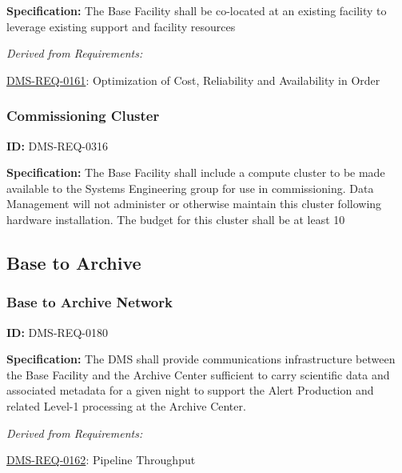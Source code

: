 \documentclass[SE,toc,lsstdraft]{lsstdoc}
\begin{document}
\textbf{Specification:} The Base Facility shall be co-located at an existing facility to leverage existing support and facility resources






\emph{Derived from Requirements:}

\hyperref[DMS-REQ-0161]{DMS-REQ-0161}:
Optimization of Cost, Reliability and Availability in Order \newline


\subsubsection{Commissioning Cluster}

\label{DMS-REQ-0316}
\textbf{ID:} DMS-REQ-0316

\textbf{Specification:} The Base Facility shall include a compute cluster to be made available to the Systems Engineering group for use in commissioning.  Data Management will not administer or otherwise maintain this cluster following hardware installation. The budget for this cluster shall be at least 10%






\subsection{Base to Archive}





\subsubsection{Base to Archive Network}

\label{DMS-REQ-0180}
\textbf{ID:} DMS-REQ-0180

\textbf{Specification:} The DMS shall provide communications infrastructure between the Base Facility and the Archive Center sufficient to carry scientific data and associated metadata for a given night to support the Alert Production and related Level-1 processing at the Archive Center.






\emph{Derived from Requirements:}

\hyperref[DMS-REQ-0162]{DMS-REQ-0162}:
Pipeline Throughput \newline
\end{document}
